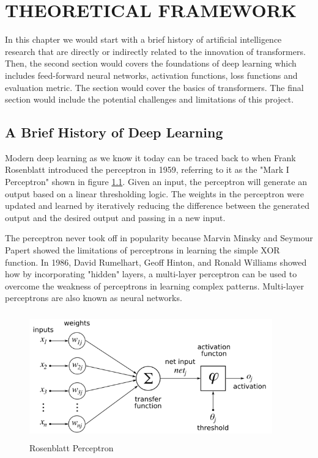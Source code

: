 \chapter{THEORETICAL FRAMEWORK}
\label{chap: 3}

In this chapter we would start with a brief history of artificial intelligence research that are directly or indirectly related to the innovation of transformers. Then, the second section would covers the foundations of deep learning which includes feed-forward neural networks, activation functions, loss functions and evaluation metric. The  section would cover the basics of transformers. The final section would include the potential challenges and limitations of this project.

\section{A Brief History of Deep Learning}

Modern deep learning as we know it today can be traced back to when Frank Rosenblatt introduced the perceptron in 1959, referring to it as the "Mark I Perceptron" shown in figure \ref{fig:perceptron}. Given an input, the perceptron will generate an output based on a linear thresholding logic. The weights in the perceptron were updated and learned by iteratively reducing the difference between the generated output and the desired output and passing in a new input.

The perceptron never took off in popularity because Marvin Minsky and Seymour Papert showed the limitations of perceptrons in learning the simple XOR function. In 1986, David Rumelhart, Geoff Hinton, and Ronald Williams showed how by incorporating "hidden" layers, a multi-layer perceptron can be used to overcome the weakness of perceptrons in learning complex patterns. Multi-layer perceptrons are also known as neural networks.

\begin{figure}[ht]
\includegraphics[width=10.5cm, height=5.5cm]{images/Rosenblattperceptron.png}
\centering
\caption{Rosenblatt Perceptron}
\label{fig:perceptron}
\end{figure}


